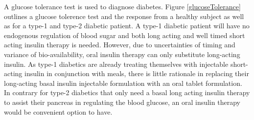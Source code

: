 A glucose tolerance test is used to diagnose diabetes. Figure \ref{glucoseTolerance} outlines a glucose tolerence test and the response from a healthy subject as well as for a type-1 and type-2 diabetic patient. A type-1 diabetic patient will have no endogenous regulation of blood sugar and both long acting and well timed short acting insulin therapy is needed. However, due to uncertainties of timing and variance of bio-availability, oral insulin therapy can only substitute long-acting insulin. As type-1 diabetics are already treating themselves with injectable short-acting insulin in conjunction with meals, there is little rationale in replacing their long-acting basal insulin injectable formulation with an oral tablet formulation. In contrary for type-2 diabetics that only need a basal long acting insulin therapy to assist their pancreas in regulating the blood glucose, an oral insulin therapy would be convenient option to have.





